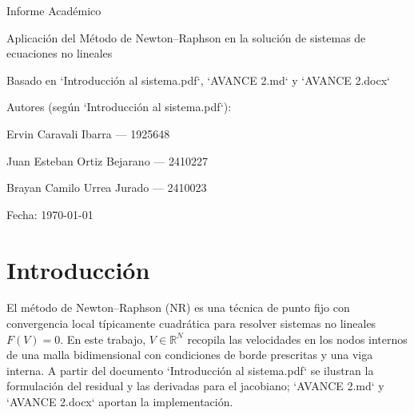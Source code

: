 \documentclass[12pt,a4paper]{report}
\theoremstyle{definition}
\begin{document}
\begin{titlepage}
  \centering
  {\Large Informe Académico}\par\vspace{0.75cm}
  {\LARGE Aplicación del Método de Newton--Raphson en la solución de sistemas de ecuaciones no lineales\par}
  \vspace{0.75cm}
  {\large Basado en `Introducción al sistema.pdf`, `AVANCE 2.md` y `AVANCE 2.docx`}\par
  \vspace{1.25cm}
  {\large Autores (según `Introducción al sistema.pdf`):\par}
  \vspace{0.25cm}
  {\large Ervin Caravali Ibarra — 1925648\par}
  {\large Juan Esteban Ortiz Bejarano — 2410227\par}
  {\large Brayan Camilo Urrea Jurado — 2410023\par}
  \vfill
  {\large Fecha: \today}\par
\end{titlepage}

\begin{abstract}
Se presenta una formulación y resolución numérica mediante el método de Newton--Raphson de un sistema de ecuaciones no lineales definido sobre una malla de tamaño \(5\times 50\). Tras imponer condiciones de frontera y omitir los nodos correspondientes a una viga interna, el problema resultante involucra \(134\) incógnitas. Se detalla la construcción del residual \(F(V)\), el ensamblaje del jacobiano esparso \(J=\partial F/\partial V\), el esquema iterativo, consideraciones de convergencia y una implementación en Python con \texttt{numpy} y \texttt{scipy.sparse}. Se incluyen figuras provenientes de `Introducción al sistema.pdf`.
\end{abstract}

\tableofcontents
\clearpage

\chapter{Introducción}
El método de Newton--Raphson (NR) es una técnica de punto fijo con convergencia local típicamente cuadrática para resolver sistemas no lineales \(F(V)=0\). En este trabajo, \(V\in\mathbb{R}^{N}\) recopila las velocidades en los nodos internos de una malla bidimensional con condiciones de borde prescritas y una viga interna. A partir del documento `Introducción al sistema.pdf` se ilustran la formulación del residual y las derivadas para el jacobiano; `AVANCE 2.md` y `AVANCE 2.docx` aportan la implementación.
\end{document}
